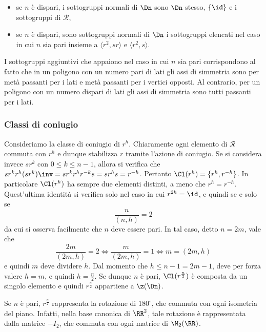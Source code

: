 \documentclass[11pt]{scrartcl}
\begin{document}
	\begin{itemize}
		\item se $n$ è dispari, i sottogruppi normali di $\Dn$ sono $\Dn$ stesso,
		$\{\id \}$ e i sottogruppi di $\mathcal{R}$,
		\item se $n$ è dispari, sono sottogruppi normali di $\Dn$ i sottogruppi elencati
		nel caso in cui $n$ sia pari insieme a $\langle r^2, sr \rangle$ e $\langle r^2, s \rangle$.
	\end{itemize}
	
	\begin{remark}
		I sottogruppi aggiuntivi che appaiono nel caso in cui $n$ sia pari corrispondono
		al fatto 
		che in un poligono con un numero pari di lati gli assi di simmetria sono 
		per metà passanti per i lati e metà passanti per i vertici opposti. Al contrario,
		per un poligono con un numero dispari
		di lati gli assi di simmetria sono tutti passanti per i lati.
	\end{remark}
	
	
	\subsubsection{Classi di coniugio}

	Consideriamo la classe di coniugio di $r^h$. Chiaramente ogni elemento di
	$\mathcal{R}$ commuta con $r^h$ e dunque stabilizza $r$ tramite l'azione di
	coniugio. Se si considera invece $sr^k$ con $0 \leq k \leq n-1$, allora si
	verifica che
	$sr^k r^h (sr^k)\inv = sr^k r^h r^{-k} s = sr^hs = r^{-h}$. Pertanto
	$\Cl(r^h) = \{r^h, r^{-h}\}$. In particolare $\Cl(r^h)$ ha sempre due
	elementi distinti, a meno che $r^h = r^{-h}$. Quest'ultima identità si
	verifica solo nel caso in cui $r^{2h} = \id$, e quindi se e solo
	se
	\[ \frac{n}{(n, h)} = 2 \]
	da cui si osserva facilmente che $n$ deve essere pari. In tal caso, detto
	$n = 2m$, vale che
	\[ \frac{2m}{(2m, h)} = 2 \iff \frac{m}{(2m, h)} = 1 \iff m = (2m, h) \]
	e quindi $m$ deve dividere $h$. Dal momento che $h \leq n-1 = 2m -1$,
	deve per forza valere $h = m$, e quindi $h = \frac{n}{2}$. Se dunque
	$n$ è pari, $\Cl(r^{\frac{n}{2}})$ è composta da un singolo elemento
	e quindi $r^{\frac{n}{2}}$ appartiene a $\z(\Dn)$.
	
	\begin{remark}
		Se $n$ è pari, $r^{\frac{n}{2}}$ rappresenta la rotazione di $180^{\circ}$,
		che commuta con ogni isometria del piano. Infatti, nella base canonica
		di $\RR^2$, tale rotazione è rappresentata dalla matrice $-I_2$, che
		commuta con ogni matrice di $\M_2(\RR)$.
	\end{remark}
	
\end{document}
